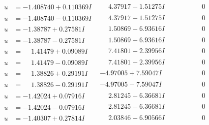 \documentclass[1p]{elsarticle_modified}
\theoremstyle{definition}
\begin{document}
$$\begin{array}{c|c|c}
\begin{aligned}
u &= -1.408740 + 0.110369 I\end{aligned}
 & \phantom{-}4.37917 - 1.51275 I & \phantom{-0.000000 } 0 \\ \hline\begin{aligned}
u &= -1.408740 - 0.110369 I\end{aligned}
 & \phantom{-}4.37917 + 1.51275 I & \phantom{-0.000000 } 0 \\ \hline\begin{aligned}
u &= -1.38787 + 0.27581 I\end{aligned}
 & \phantom{-}1.50869 - 6.93616 I & \phantom{-0.000000 } 0 \\ \hline\begin{aligned}
u &= -1.38787 - 0.27581 I\end{aligned}
 & \phantom{-}1.50869 + 6.93616 I & \phantom{-0.000000 } 0 \\ \hline\begin{aligned}
u &= \phantom{-}1.41479 + 0.09089 I\end{aligned}
 & \phantom{-}7.41801 - 2.39956 I & \phantom{-0.000000 } 0 \\ \hline\begin{aligned}
u &= \phantom{-}1.41479 - 0.09089 I\end{aligned}
 & \phantom{-}7.41801 + 2.39956 I & \phantom{-0.000000 } 0 \\ \hline\begin{aligned}
u &= \phantom{-}1.38826 + 0.29191 I\end{aligned}
 & -4.97005 + 7.59047 I & \phantom{-0.000000 } 0 \\ \hline\begin{aligned}
u &= \phantom{-}1.38826 - 0.29191 I\end{aligned}
 & -4.97005 - 7.59047 I & \phantom{-0.000000 } 0 \\ \hline\begin{aligned}
u &= -1.42024 + 0.07916 I\end{aligned}
 & \phantom{-}2.81245 + 6.36681 I & \phantom{-0.000000 } 0 \\ \hline\begin{aligned}
u &= -1.42024 - 0.07916 I\end{aligned}
 & \phantom{-}2.81245 - 6.36681 I & \phantom{-0.000000 } 0 \\ \hline\begin{aligned}
u &= -1.40307 + 0.27814 I\end{aligned}
 & \phantom{-}2.03846 - 6.90566 I & \phantom{-0.000000 } 0 \\ \hline\begin{aligned}

\end{aligned}
\end{array}$$
\end{document}
